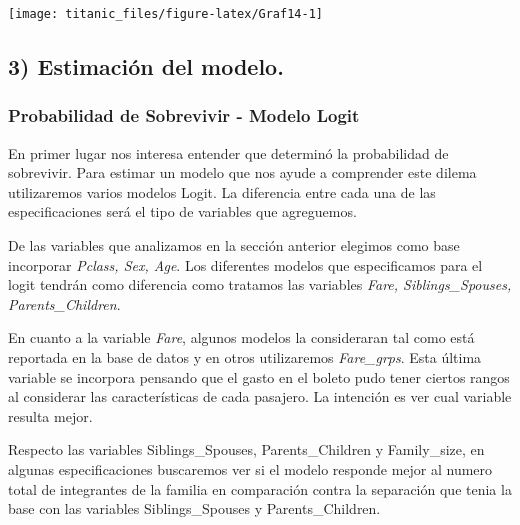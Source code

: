 \documentclass[
]{article}
\begin{document}
\begin{center}\texttt{[image: titanic\_files/figure-latex/Graf14-1]} \end{center}

\hypertarget{estimaciuxf3n-del-modelo.}{%
\subsection{3) Estimación del modelo.}\label{estimaciuxf3n-del-modelo.}}

\hypertarget{probabilidad-de-sobrevivir---modelo-logit}{%
\subsubsection{Probabilidad de Sobrevivir - Modelo
Logit}\label{probabilidad-de-sobrevivir---modelo-logit}}

En primer lugar nos interesa entender que determinó la probabilidad de
sobrevivir. Para estimar un modelo que nos ayude a comprender este
dilema utilizaremos varios modelos Logit. La diferencia entre cada una
de las especificaciones será el tipo de variables que agreguemos.

De las variables que analizamos en la sección anterior elegimos como
base incorporar \emph{Pclass, Sex, Age}. Los diferentes modelos que
especificamos para el logit tendrán como diferencia como tratamos las
variables \emph{Fare, Siblings\_Spouses, Parents\_Children}.

En cuanto a la variable \emph{Fare}, algunos modelos la consideraran tal
como está reportada en la base de datos y en otros utilizaremos
\emph{Fare\_grps}. Esta última variable se incorpora pensando que el
gasto en el boleto pudo tener ciertos rangos al considerar las
características de cada pasajero. La intención es ver cual variable
resulta mejor.

Respecto las variables Siblings\_Spouses, Parents\_Children y
Family\_size, en algunas especificaciones buscaremos ver si el modelo
responde mejor al numero total de integrantes de la familia en
comparación contra la separación que tenia la base con las variables
Siblings\_Spouses y Parents\_Children.
\end{document}
